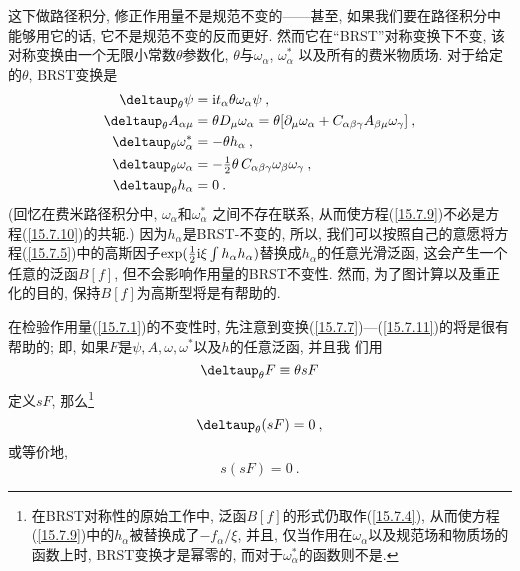 这下做路径积分, 修正作用量不是规范不变的——甚至, 如果我们要在路径积分中能够用它的话, 它不是规范不变的反而更好. 然而它在``BRST''对称变换下不变, 该对称变换由一个无限小常数$\theta $参数化, $\theta $与$\omega _{\alpha }$, $\omega _{\alpha }^{\ast }$%
以及所有的费米物质场{}. 对于给定的$\theta $, BRST变换是\begin{align}
\deltaup_{\theta }\psi  &=\mi t_{\alpha }\theta \omega _{\alpha }\psi \:, 
\label{15.7.7} \\
\deltaup_{\theta }A_{\alpha \mu } &=\theta D_{\mu }\omega _{\alpha }=\theta
[ \partial _{\mu }\omega _{\alpha }+C_{\alpha \beta \gamma }A_{\beta
\mu }\omega _{\gamma }]\:,   \label{15.7.8} \\
\deltaup_{\theta }\omega _{\alpha }^{\ast } &=-\theta h_{\alpha }\:, 
\label{15.7.9} \\
\deltaup_{\theta }\omega _{\alpha } &=-\tfrac{1}{2}\theta\, C_{\alpha \beta
\gamma }\omega _{\beta }\omega _{\gamma }\:,   \label{15.7.10} \\
\deltaup_{\theta }h_{\alpha } &=0\:.   \label{15.7.11}
\end{align}%
(回忆在费米路径积分中, $\omega _{\alpha }$和$\omega _{\alpha }^{\ast }$%
之间不存在联系, 从而使方程(\ref{15.7.9})不必是方程(\ref{15.7.10})的共轭.) 因为$h_{\alpha
}$是BRST-不变的, 所以, 我们可以按照自己的意愿将方程(\ref{15.7.5})中的高斯因子$\exp (\frac{1}{2}\mathrm{i}\xi
\int h_{\alpha }h_{\alpha })$替换成$h_{\alpha }$的任意光滑泛函, 这会产生一个任意的泛函$B[f]$,
但不会影响作用量的BRST不变性. 然而, 为了图计算以及重正化的目的, 保持$B[f]$为高斯型将是有帮助的.

在检验作用量(\ref{15.7.1})的不变性时, 先注意到变换(\ref{15.7.7})---(\ref{15.7.11})的{}将是很有帮助的; 即, 如果$F$是$\psi ,A,\omega ,\omega ^{\ast }$以及$h$的任意泛函, 并且我%
们用\begin{equation}
\deltaup_{\theta }F\equiv \theta sF  \label{15.7.12}
\end{equation}%
定义$sF$, 那么\footnote{在BRST对称性的原始工作中, 泛函$B[f]$的形式仍取作(\ref{15.7.4}), 从而使方程(\ref{15.7.9})中的$h_{\alpha}$被替换成了$-f_{\alpha}/\xi$, 并且, 仅当作用在$\omega_{\alpha}$以及规范场和物质场的函数上时, BRST变换才是幂零的, 而对于$\omega_{\alpha}^{\ast}$的函数则不是.}
\begin{equation}
\deltaup_{\theta }(sF)=0\:,   \label{15.7.13}
\end{equation}%
或等价地,
\begin{equation}
s(sF)=0\:.   \label{15.7.14}
\end{equation}

